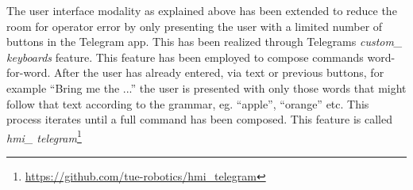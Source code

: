 \label{ssec:keyboard}
\noindent The user interface modality as explained above has been extended to reduce the room for operator error by only presenting the user with a limited number of buttons in the Telegram app. This has been realized through Telegrams \emph{custom\_ keyboards} feature. %
This feature has been employed to compose commands word-for-word. After the user has already entered, via text or previous buttons, for example “Bring me the ...” the user is presented with only those words that might follow that text according to the grammar, eg. “apple”, “orange” etc. This process iterates until a full command has been composed. This feature is called \emph{hmi\_ telegram}\footnote{\url{https://github.com/tue-robotics/hmi_telegram}}